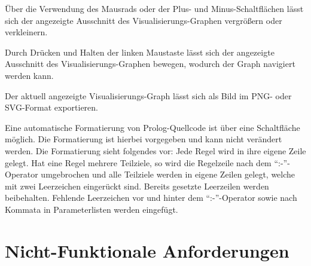 \documentclass[parskip=full,11pt,twoside]{scrartcl}
\begin{document}

Über die Verwendung des Mausrads oder der Plus- und Minus-Schaltflächen lässt sich der angezeigte Ausschnitt des Visualisierungs-Graphen vergrößern oder verkleinern.


Durch Drücken und Halten der linken Maustaste lässt sich der angezeigte Ausschnitt des Visualisierungs-Graphen bewegen, wodurch der Graph navigiert werden kann.


Der aktuell angezeigte Visualisierungs-Graph lässt sich als Bild im PNG- oder SVG-Format exportieren.


Eine automatische Formatierung von Prolog-Quellcode ist über eine Schaltfläche möglich. Die Formatierung ist hierbei vorgegeben und kann nicht verändert werden. Die Formatierung sieht folgendes vor: Jede Regel wird in ihre eigene Zeile gelegt. Hat eine Regel mehrere Teilziele, so wird die Regelzeile nach dem \enquote{:-}-Operator umgebrochen und alle Teilziele werden in eigene Zeilen gelegt, welche mit zwei Leerzeichen eingerückt sind. Bereits gesetzte Leerzeilen werden beibehalten. Fehlende Leerzeichen vor und hinter dem \enquote{:-}-Operator sowie nach Kommata in Parameterlisten werden eingefügt.



\section{Nicht-Funktionale Anforderungen}

\end{document}
